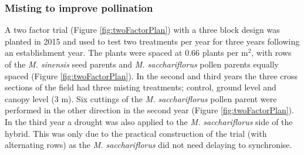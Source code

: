 \documentclass[fleqn, 15pt, lineno]{olplainarticle}
\begin{document}
\FloatBarrier
\subsubsection{Misting to improve pollination}
A two factor trial (Figure \ref{fig:twoFactorPlan}) with a three block design was planted in 2015 and used to test two treatments per year for three years following an establishment year.
The plants were spaced at 0.66 plants per m$^2$, with rows of the \textit{M. sinensis} seed parents and \textit{M. sacchariflorus} pollen parents equally spaced (Figure \ref{fig:twoFactorPlan}).
In the second and third years the three cross sections of the field had three misting treatments; control, ground level and canopy level (3 m).
Six cuttings of the \textit{M. sacchariflorus} pollen parent were performed in the other direction in the second year (Figure \ref{fig:twoFactorPlan}).
In the third year a drought was also applied to the \textit{M. sacchariflorus} side of the hybrid.
This was only due to the practical construction of the trial (with alternating rows) as the \textit{M. sacchariflorus} did not need delaying to synchronise.
\end{document}
